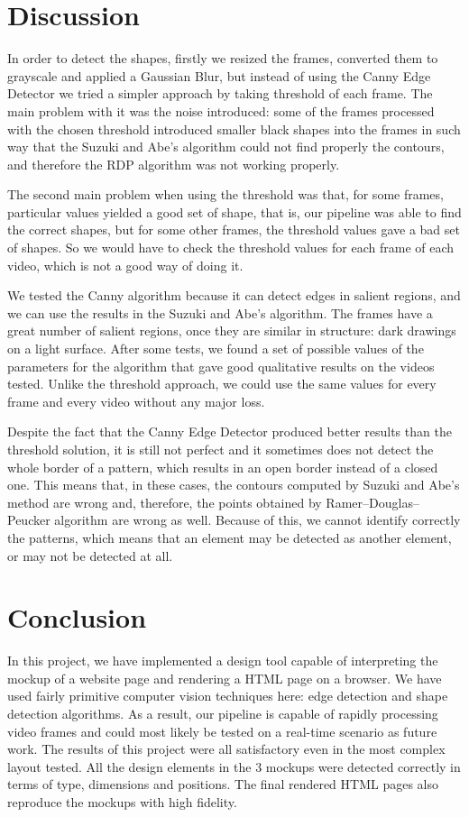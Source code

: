 \documentclass[]{IEEEtran}
\begin{document}
  \section{Discussion}
  \label{sec:discussion}
  In order to detect the shapes, firstly we resized the frames, converted them to grayscale and applied a Gaussian Blur, but instead of using the Canny Edge Detector we tried a simpler approach by taking threshold of each frame. The main problem with it was the noise introduced: some of the frames processed with the chosen threshold introduced smaller black shapes into the frames in such way that the Suzuki and Abe's algorithm could not find properly the contours, and therefore the RDP algorithm was not working properly.
  
  The second main problem when using the threshold was that, for some frames, particular values yielded a good set of shape, that is, our pipeline was able to find the correct shapes, but for some other frames, the threshold values gave a bad set of shapes. So we would have to check the threshold values for each frame of each video, which is not a good way of doing it.
  
  We tested the Canny algorithm because it can detect edges in salient regions, and we can use the results in the Suzuki and  Abe's algorithm. The frames have a great number of salient regions, once they are similar in structure: dark drawings on a light surface. After some tests, we found a set of possible values of the parameters for the algorithm that gave good qualitative results on the videos tested. Unlike the threshold approach, we could use the same values for every frame and every video without any major loss.
  
  Despite the fact that the Canny Edge Detector produced better results than the threshold solution, it is still not perfect and it sometimes does not detect the whole border of a pattern, which results in an open border instead of a closed one. This means that, in these cases, the contours computed by Suzuki and Abe's method are wrong and, therefore, the points obtained by Ramer–Douglas–Peucker algorithm are wrong as well. Because of this, we cannot identify correctly the patterns, which means that an element may be detected as another element, or may not be detected at all.
  
  \section{Conclusion}
  In this project, we have implemented a design tool capable of interpreting the mockup of a website page and rendering a HTML page on a browser. We have used fairly primitive computer vision techniques here: edge detection and shape detection algorithms. As a result, our pipeline is capable of rapidly processing video frames and could most likely be tested on a real-time scenario as future work. The results of this project were all satisfactory even in the most complex layout tested. All the design elements in the 3 mockups were detected correctly in terms of type, dimensions and positions. The final rendered HTML pages also reproduce the mockups with high fidelity.
    
\end{document}
